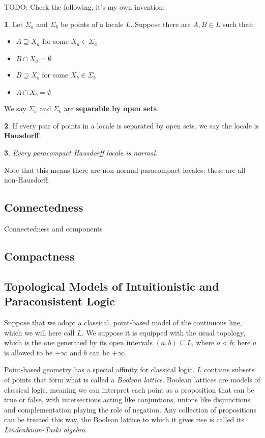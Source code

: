 \documentclass[oneside,english]{amsbook}
\numberwithin{section}{chapter}
\theoremstyle{plain}
\newtheorem{thm}{\protect\theoremname}
\theoremstyle{definition}
\newtheorem{defn}[thm]{\protect\definitionname}
\providecommand{\definitionname}{Definition}
\providecommand{\theoremname}{Theorem}
\begin{document}
TODO: Check the following, it's my own invention:

\begin{defn}Let $\Sigma_a$ and $\Sigma_b$ be points of a locale $L$. Suppose there are $A, B\in L$ such that:
	\begin{itemize}
		\item{$A \supseteq X_a$ for some $X_a\in \Sigma_a$}
		\item{$B \cap X_a = \emptyset$}
		\item{$B \supseteq X_b$ for some $X_b\in \Sigma_b$}
		\item{$A \cap X_b = \emptyset$}
	\end{itemize} 	
	We say $\Sigma_a$ and $\Sigma_b$ are \textbf{separable by open sets}.
\end{defn}

\begin{defn}
	If every pair of points in a locale is separated by open sets, we say the locale is \textbf{Hausdorff}.
\end{defn}

\begin{thm}
	Every paracompact Hausdorff locale is normal.
\end{thm}

Note that this means there are non-normal paracompact locales; these are all non-Hausdorff.

\subsection{Connectedness}

Connectedness and components


\subsection{Compactness}


\subsection{Topological Models of Intuitionistic and Paraconsistent Logic}

Suppose that we adopt a classical, point-based model of the continuous line, which we will here call $L$. We suppose it is equipped with the usual topology, which is the one generated by its open intervals $(a, b)\subseteq L$, where $a < b$; here $a$ is allowed to be $-\infty$ and $b$ can be $+\infty$. 

Point-based geometry has a special affinity for classical logic. $L$ contains subsets of points that form what is called a \emph{Boolean lattice}. Boolean lattices are models of classical logic, meaning we can interpret each point as a proposition that can be true or false, with intersections acting like conjuntions, unions like disjunctions and complementation playing the role of negation. Any collection of propositions can be treated this way, the Boolean lattice to which it gives rise is called its \emph{Lindenbaum-Taski algebra}.
\end{document}
